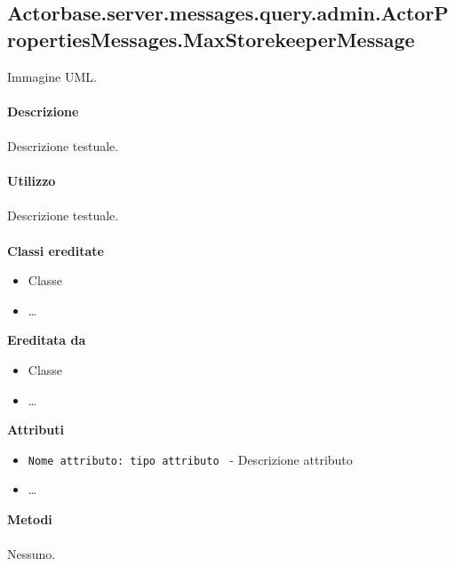 \documentclass[a4paper]{article}
\begin{document}
\subsection{Actorbase.server.messages.query.admin.ActorPropertiesMessages.MaxStorekeeperMessage}
		Immagine UML.
		\\ \\
		\textbf{Descrizione}
			\\ \\
			Descrizione testuale.
			\\ \\
		\textbf{Utilizzo}
			\\ \\
			Descrizione testuale.
			\\ \\
		\textbf{Classi ereditate}
			\begin{itemize}
				\item Classe
				\item \dots
			\end{itemize}
		\textbf{Ereditata da}
			\begin{itemize}
				\item Classe
				\item \dots
			\end{itemize}
		\textbf{Attributi}
			\begin{itemize}
				\item \texttt{Nome attributo: tipo attributo } - Descrizione attributo
				\item \dots
			\end{itemize}
		\textbf{Metodi}
			\\ \\
			Nessuno.
			
\end{document}
